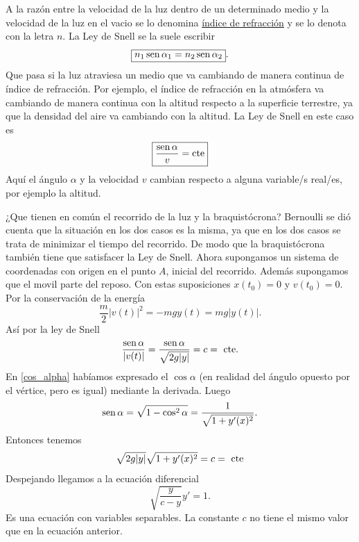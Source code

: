  A la razón entre la velocidad de la luz dentro de un determinado medio y la velocidad de la luz en el vacio se lo denomina
\href{http://es.wikipedia.org/wiki/Índice_de_refracción}{índice de refracción} y se lo denota con la letra $n$. La Ley de Snell se la suele escribir
\[\boxed{n_1\sen\alpha_1=n_2\sen\alpha_2 }.\]
Que pasa si la luz atraviesa un medio que va cambiando de manera continua de índice de refracción. Por ejemplo, el índice de refracción en la atmósfera
va cambiando de manera continua con la altitud respecto a la superficie terrestre, ya que la densidad del aire va cambiando con la altitud. La Ley de
Snell en este caso es
\[\boxed{\frac{\sen\alpha}{v}=\text{cte}}\]
Aquí el ángulo $\alpha$ y la velocidad $v$ cambian respecto a alguna variable/s real/es, por ejemplo la altitud.


¿Que tienen en común el recorrido de la luz y la braquistócrona? Bernoulli se dió cuenta que la situación en los dos casos es la misma, ya que en los dos casos
se trata de minimizar el tiempo del recorrido. De modo que la braquistócrona también tiene que satisfacer la Ley de Snell.
 Ahora supongamos un sistema de coordenadas con origen en el punto $A$, inicial del recorrido.  Además supongamos que el movil  parte
del reposo. Con estas suposiciones $x(t_0)=0$ y $v(t_0)=0$. Por la conservación de la energía 
\[\frac{m}{2}|v(t)|^2=-mgy(t)=mg|y(t)|.\]
 Así por la ley de Snell
\[\frac{\sen\alpha}{|v(t)|}=\frac{\sen\alpha}{\sqrt{2g|y|}}=c=\text{ cte}.\]
En \eqref{cos_alpha} habíamos expresado el $\cos\alpha$ (en realidad del ángulo opuesto por el vértice, pero es igual) mediante la derivada. Luego
\[\sen\alpha=\sqrt{1-\cos^2\alpha}=\frac{1}{\sqrt{1+y'(x)^2}}.\]
Entonces tenemos
\[\sqrt{2g|y|}\sqrt{1+y'(x)^2}=c=\hbox{ cte}\]
Despejando llegamos a la ecuación diferencial
\[\boxed{\sqrt{\frac{y}{c-y}}y'=1}.\]
Es una ecuación con variables separables. La constante $c$ no tiene el mismo valor que en la ecuación anterior.  

